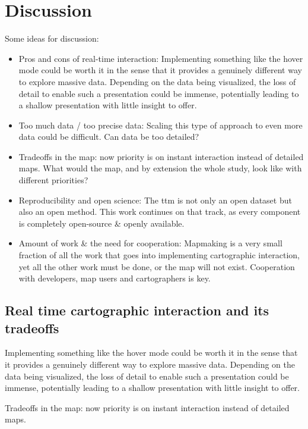 \section{Discussion}

Some ideas for discussion:
\begin{itemize}
	\item Pros and cons of real-time interaction:
	Implementing something like the hover mode could be worth it in the sense
	that it provides a genuinely different way to explore massive data.
	Depending on the data being visualized,
	the loss of detail to enable such a presentation could be immense,
	potentially leading to a shallow presentation with little insight to offer.
	\item Too much data / too precise data:
	Scaling this type of approach to even more data could be difficult. Can data be too detailed?
	\item Tradeoffs in the map:
	now priority is on instant interaction instead of detailed maps.
	What would the map, and by extension the whole study, look like with different priorities?
	\item Reproducibility and open science:
	The \acrshort{ttm} is not only an open dataset but also an open method.
	This work continues on that track,
	as every component is completely open-source \& openly available.
	\item Amount of work \& the need for cooperation:
	Mapmaking is a very small fraction of all the work that goes into implementing cartographic interaction,
	yet all the other work must be done, or the map will not exist.
	Cooperation with developers, map users and cartographers is key.
\end{itemize}

\subsection{Real time cartographic interaction and its tradeoffs}

Implementing something like the hover mode could be worth it in the sense
that it provides a genuinely different way to explore massive data.
Depending on the data being visualized,
the loss of detail to enable such a presentation could be immense,
potentially leading to a shallow presentation with little insight to offer.

Tradeoffs in the map:
now priority is on instant interaction instead of detailed maps.


